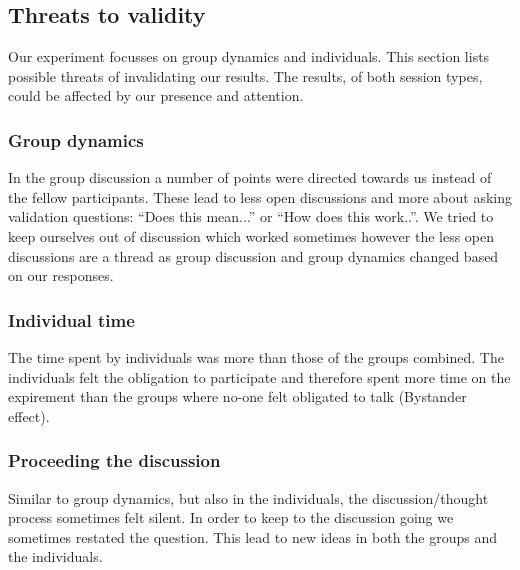 \subsection{Threats to validity}
\label{threats}

Our experiment focusses on group dynamics and individuals. 
This section lists possible threats of invalidating our results. The results, of both session types, could be affected by our presence and attention.

\subsubsection{Group dynamics}

In the group discussion a number of points were directed towards us instead of the fellow participants.
These lead to less open discussions and more about asking validation questions: ``Does this mean...'' or ``How does this work..''.
We tried to keep ourselves out of discussion which worked sometimes however the less open discussions are a thread as group discussion
and group dynamics changed based on our responses.

\subsubsection{Individual time}
The time spent by individuals was more than those of the groups combined. The individuals felt the obligation to participate
and therefore spent more time on the expirement than the groups where no-one felt obligated to talk (Bystander effect).

\subsubsection{Proceeding the discussion}
Similar to group dynamics, but also in the individuals, the discussion/thought process sometimes felt silent. In order to keep to the discussion
going we sometimes restated the question. This lead to new ideas in both the groups and the individuals.